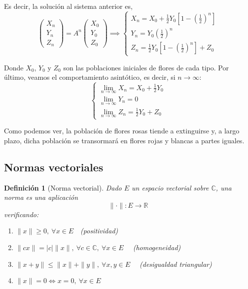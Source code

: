 \documentclass[11pt, a4paper]{article}
\newif\IfInSansMode
\numberwithin{equation}{section}
\theoremstyle{theorem-style}
\theoremstyle{definition-style}
\newtheorem{ndef}{Definición}[section]
\theoremstyle{remark-style}
\theoremstyle{example-style}
\newenvironment{nlist}
{\begin{enumerate}
    \renewcommand\labelenumi{(\emph{\roman{enumi})}}}
  {\end{enumerate}}
\begin{document}
Es decir, la solución al sistema anterior es,
$$ \begin{pmatrix}
	X_n\\
	Y_n\\
	Z_n
\end{pmatrix} = A^n 
\begin{pmatrix}
	X_0\\
	Y_0\\
	Z_0
\end{pmatrix} \implies
\begin{cases}
  X_n = X_0 + \frac{1}{2} Y_0 \left[ 1 - \left( \frac{1}{2} \right)^n
  \right]\\
  Y_n = Y_0 \left( \frac{1}{2} \right)^n \\
  Z_n = \frac{1}{2} Y_0 \left[ 1 - \left( \frac{1}{2} \right)^n
  \right]
  + Z_0
\end{cases}$$

Donde $X_0$, $Y_0$ y $Z_0$ son las poblaciones iniciales de flores de cada tipo. Por último, veamos el comportamiento asintótico, es decir, si $n\to\infty$:
$$\begin{cases}
\underset{n\to\infty }{\lim} X_n = X_0 + \frac{1}{2}Y_0\\
\underset{n\to\infty }{\lim}Y_n = 0\\
\underset{n\to\infty }{\lim}Z_n = \frac{1}{2}Y_0 + Z_0	
\end{cases}$$

Como podemos ver, la población de flores rosas tiende a extinguirse y, a largo plazo, dicha población se transormará en flores rojas y blancas a partes iguales.

\subsection{Normas vectoriales}

\begin{ndef}[Norma vectorial]
Dado $E$ un espacio vectorial sobre $\mathbb C$, una \textit{norma} es una aplicación $$\|\cdot\|: E \longrightarrow \mathbb{R}$$
verificando:
\begin{nlist}
	\item $\|x\| \ge 0, \ \forall x \in E\quad$(positividad)
	\item $\|cx\| = |c|\|x\|, \ \forall c \in \mathbb{C},\ \forall x \in E\quad$ (homogeneidad)
	\item $\|x + y \| \le \|x\| + \|y\|, \ \forall x,y \in E\quad$ (desigualdad triangular)
	\item $\|x\| = 0 \iff x = 0,\ \forall x \in E$
	
\end{nlist}	
\end{ndef}
\end{document}
